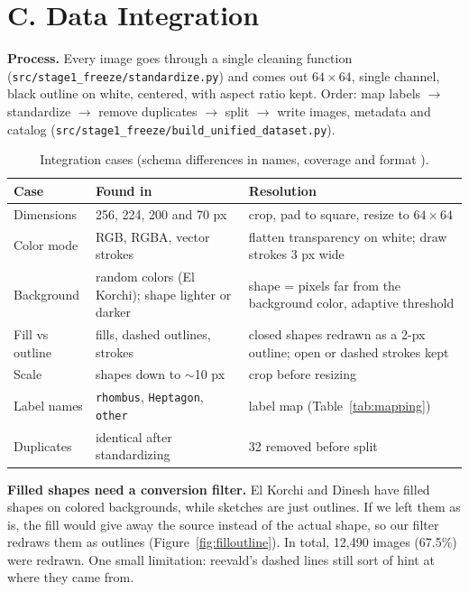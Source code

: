 \documentclass[11pt]{article}
\begin{document}
\section*{C. Data Integration}

\textbf{Process.} Every image goes through a single cleaning function
(\nolinkurl{src/stage1_freeze/standardize.py}) and comes out $64{\times}64$,
single channel, black outline on white, centered, with aspect ratio kept. 
Order: map labels $\to$ standardize $\to$ remove duplicates $\to$ split
$\to$ write images, metadata and catalog
(\nolinkurl{src/stage1_freeze/build_unified_dataset.py}).

\begin{table}[H]
\centering
\caption{Integration cases (schema differences in names, coverage and
format \cite[slide 35]{lecfd}).}
\label{tab:cases}
\small
\begin{tabularx}{\linewidth}{@{}p{2.6cm} p{5cm} X@{}}
\toprule
Case & Found in & Resolution \\
\midrule
Dimensions & 256, 224, 200 and 70 px &
  crop, pad to square, resize to $64{\times}64$ \\
Color mode & RGB, RGBA, vector strokes &
  flatten transparency on white; draw strokes 3 px wide \\
Background & random colors (El Korchi); shape lighter or darker &
  shape = pixels far from the background color, adaptive threshold \\
Fill vs outline & fills, dashed outlines, strokes &
  closed shapes redrawn as a 2-px outline; open or dashed strokes kept \\
Scale & shapes down to $\sim$10 px & crop before resizing \\
Label names & \texttt{rhombus}, \texttt{Heptagon}, \texttt{other} &
  label map (Table~\ref{tab:mapping}) \\
Duplicates & identical after standardizing & 32 removed before split \\
\bottomrule
\end{tabularx}
\end{table}

\textbf{Filled shapes need a conversion filter.} El Korchi and Dinesh
have filled shapes on colored backgrounds, while sketches are just outlines.
If we left them as is, the fill would give away the source instead of the actual shape, so our
filter redraws them as outlines (Figure~\ref{fig:filloutline}). In total, 12,490
images (67.5\%) were redrawn. One small limitation: reevald's dashed lines still sort of hint at
where they came from.
\end{document}
